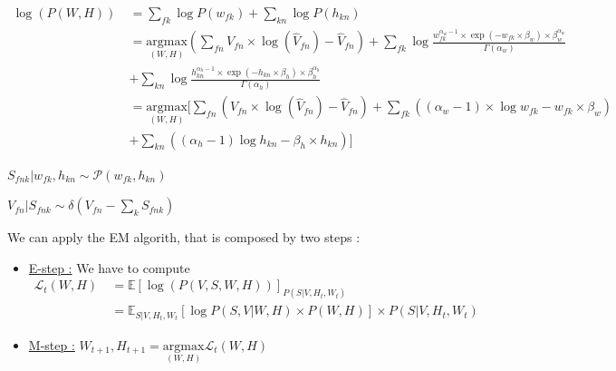 \documentclass[a4paper,12pt]{article} %
\begin{document}
\begin{align*}
\log(P(W,H)) \: &= \sum\limits_{fk}\log P(w_{fk})+\sum\limits_{kn}\log P(h_{kn}) \\
&= \underset{(W,H)}{\mathrm{argmax}}\left(\sum\limits_{fn}V_{fn}\times \log(\hat{V}_{fn}) - \hat{V}_{fn}\right)+\sum\limits_{fk} \log \frac{w_{fk}^{\alpha_w-1}\times \exp(-w_{fk} \times \beta_w) \times \beta_{w}^{\alpha_w}} {\Gamma(\alpha_w)} \\
&+ \sum\limits_{kn} \log \frac{h_{kn}^{\alpha_h-1}\times \exp(-h_{kn} \times \beta_h) \times \beta_{h}^{\alpha_h}} {\Gamma(\alpha_h)} \\
&= \underset{(W,H)}{\mathrm{argmax}}[\sum\limits_{fn}(V_{fn}\times \log(\hat{V}_{fn}) - \hat{V}_{fn})+\sum\limits_{fk}((\alpha_w-1)\times \log w_{fk}-w_{fk}\times \beta_w) \\
&+ \sum\limits_{kn} ((\alpha_h-1)\log h_{kn} - \beta_h\times h_{kn})]
\end{align*}

$S_{fnk}|w_{fk},h_{kn}\sim \mathcal{P}(w_{fk},h_{kn})$

$V_{fn}|S_{fnk}\sim \delta(V_{fn}-\sum\limits_{k}S_{fnk})$\vspace{1\baselineskip}

We can apply the EM algorith, that is composed by two steps :
\begin{itemize}
\item \underline{E-step :} We have to compute \begin{align*} \mathcal{L}_t(W,H) \: &= \mathbb{E}[\log(P(V,S,W,H))]_{P(S|V,H_t,W_t)}\\
&= \mathbb{E}_{S|V,H_t,W_t}[\log P(S,V|W,H)\times P(W,H)]\times P(S|V,H_t,W_t)
\end{align*}
\item \underline{M-step :} $W_{t+1},H_{t+1}=\underset{(W,H)}{\mathrm{argmax}}\mathcal{L}_t(W,H)$\\
\end{itemize}
\end{document}
